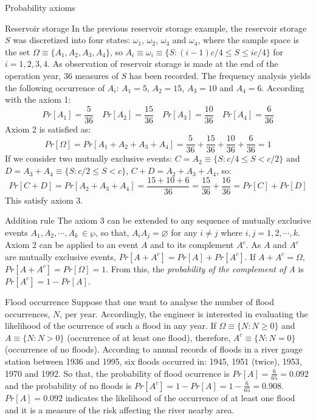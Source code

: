 \documentclass[8pt]{beamer}
\begin{document}
\begin{frame}{Probability axioms}
    \begin{exampleblock}{Reservoir storage}
        In the previous reservoir storage example, the reservoir storage $S$ was discretized into four states: $\omega_1$, $\omega_2$, $\omega_3$ and $\omega_4$, where the sample space is the set $\Omega \equiv \{A_1, A_2, A_3, A_4 \}$, so $A_i \equiv \omega_i \equiv \{ S: (i-1)c/4 \leq S \leq ic/4 \}$ for $i = 1, 2, 3, 4$. As observation of reservoir storage is made at the end of the operation year, 36 measures of $S$ has been recorded. The frequency analysis yields the following occurrence of $A_i$: $A_1 = 5$, $A_2 = 15$, $A_3 = 10$ and $A_4 = 6$. According with the \alert{axiom 1}:
        $$
        Pr[A_1] = \frac{5}{36} \quad Pr[A_2] = \frac{15}{36} \quad Pr[A_3] = \frac{10}{36} \quad Pr[A_4] = \frac{6}{36} 
        $$
        \alert{Axiom 2} is satisfied as:
        $$
        Pr[\Omega] = Pr[ A_1 + A_2 + A_3 + A_4 ] = \frac{5}{36} + \frac{15}{36} + \frac{10}{36} + \frac{6}{36} = 1
        $$
        If we consider two mutually exclusive events: $C = A_2 \equiv \{ S: c/4 \leq S < c/2 \}$ and $D = A_3 + A_4 \equiv \{ S: c/2 \leq S < c \}$, $C + D = A_2 + A_3 + A_4$, so:
        $$
        Pr[C + D] = Pr[ A_2 + A_3 + A_4 ] = \frac{15 + 10 + 6}{36} = \frac{15}{36} + \frac{16}{36} = Pr[C] + Pr[D]
        $$
        This satisfy \alert{axiom 3}. 
    \end{exampleblock}
\end{frame}

\begin{frame}{Addition rule}
    The axiom 3 can be extended to any sequence of mutually exclusive events $A_1, A_2, \cdots, A_k \, \in \wp$, so that, $A_i A_j = \varnothing$ for any $i \neq j$ where $i,j = 1, 2, \cdots, k$. Axiom 2 can be applied to an event $A$ and to its complement $A^c$. As $A$ and $A^c$ are mutually exclusive events, $Pr[A + A^c] = Pr[A] + Pr[A^c] $. If $A + A^c = \Omega$, $Pr[A + A^c] = Pr[\Omega] = 1$. From this, the \emph{probability of the complement of A} is $Pr[A^c] = 1 - Pr[A]$.
    \begin{exampleblock}{Flood occurrence}
        Suppose that one want to analyse the number of flood occurrences, $N$,  per year. Accordingly, the engineer is interested in evaluating the likelihood of the ocurrence of such a flood in any year. If $\Omega \equiv \{ N : N \geq 0 \}$ and $A \equiv \{ N : N > 0 \}$ (occurrence of at least one flood), therefore, $A^c \equiv \{ N : N = 0 \}$ (occurrence of no floods). According to annual records of floods in a river gauge station between 1936 and 1995, six floods occurred in: 1945, 1951 (twice), 1953, 1970 and 1992. So that, the probability of flood ocurrence is $Pr[A] = \frac{6}{65} = 0.092$ and the probability of no floods is $Pr[A^c ] = 1 - Pr[A] = 1 - \frac{6}{65} = 0.908$. $Pr[A] = 0.092$ indicates the likelihood of the occurrence of at least one flood and it is a measure of the risk affecting the river nearby area. 
    \end{exampleblock}
\end{frame}
\end{document}
